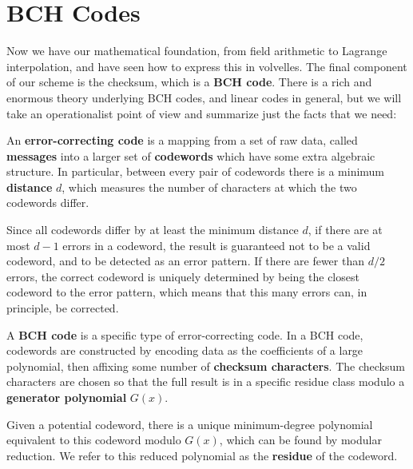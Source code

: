\documentclass[letterpaper]{article}
\begin{document}
\section{BCH Codes}

Now we have our mathematical foundation, from field arithmetic to Lagrange
interpolation, and have seen how to express this in volvelles. The final
component of our scheme is the checksum, which is a \textbf{BCH code}. There is a
rich and enormous theory underlying BCH codes, and linear codes in general,
but we will take an operationalist point of view and summarize just the facts
that we need:

An \textbf{error-correcting code} is a mapping from a set of raw data, called
\textbf{messages} into a larger set of \textbf{codewords} which have
some extra algebraic structure. In particular, between every pair of
codewords there is a minimum \textbf{distance} $d$, which measures the
number of characters at which the two codewords differ.

Since all codewords differ by at least the minimum distance $d$, if there
are at most $d-1$ errors in a codeword, the result is guaranteed not to
be a valid codeword, and to be detected as an error pattern. If there are fewer
than $d/2$ errors, the correct codeword is uniquely determined by being
the closest codeword to the error pattern, which means that this many
errors can, in principle, be corrected.

A \textbf{BCH code} is a specific type of error-correcting code. In a BCH
code, codewords are constructed by encoding data as the coefficients of a
large polynomial, then affixing some number of \textbf{checksum characters}.
The checksum characters are chosen so that the full result is in
a specific residue class modulo a \textbf{generator polynomial} $G(x)$.

Given a potential codeword, there is a unique minimum-degree polynomial
equivalent to this codeword modulo $G(x)$, which can be found by modular
reduction. We refer to this reduced polynomial as the \textbf{residue}
of the codeword.
\end{document}
